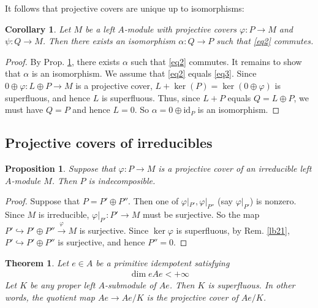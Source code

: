\documentclass[11pt,b5paper,notitlepage]{article}
\theoremstyle{definition}
\theoremstyle{plain}
\newtheorem{thm}[df]{Theorem}
\newtheorem{pp}[df]{Proposition}
\newtheorem{co}[df]{Corollary}
\newcommand{\id}{\mathrm{id}}
\numberwithin{equation}{section}
\begin{document}
It follows that projective covers are unique up to isomorphisms:

\begin{co}\label{lb22}
Let $M$ be a left $A$-module with projective covers $\varphi:P\rightarrow M$ and $\psi:Q\rightarrow M$. Then there exists an isomorphism $\alpha:Q\rightarrow P$ such that \eqref{eq2} commutes.
\end{co}

\begin{proof}
By Prop. \ref{lb22}, there exists $\alpha$ such that \eqref{eq2} commutes. It remains to show that $\alpha$ is an isomorphism. We assume that \eqref{eq2} equals \eqref{eq3}. Since $0\oplus\varphi:L\oplus P\rightarrow M$ is a projective cover, $L+\ker(P)=\ker(0\oplus\varphi)$ is superfluous, and hence $L$ is superfluous. Thus, since $L+P$ equals $Q=L\oplus P$, we must have $Q=P$ and hence $L=0$. So $\alpha=0\oplus\id_P$ is an isomorphism.  
\end{proof}



\subsection{Projective covers of irreducibles}


\begin{pp}\label{lb24}
Suppose that $\varphi:P\rightarrow M$ is a projective cover of an irreducible left $A$-module $M$. Then $P$ is indecomposible.
\end{pp}

\begin{proof}
Suppose that $P=P'\oplus P''$. Then one of $\varphi|_{P'},\varphi|_{P''}$ (say $\varphi|_{P'}$) is nonzero. Since $M$ is irreducible,  $\varphi|_{P'}:P'\rightarrow M$ must be surjective. So the map $P'\hookrightarrow P'\oplus P''\xrightarrow{\varphi}M$ is surjective. Since $\ker\varphi$ is superfluous, by Rem. \ref{lb21}, $P'\hookrightarrow P'\oplus P''$ is surjective, and hence $P''=0$.
\end{proof}








\begin{thm}\label{lb8}
Let $e\in A$ be a primitive idempotent satisfying
\begin{align*}
\dim eAe<+\infty
\end{align*}
Let $K$ be any proper left $A$-submodule of $Ae$. Then $K$ is superfluous. In other words, the quotient map $Ae\rightarrow Ae/K$ is the projective cover of $Ae/K$.
\end{thm}
\end{document}
